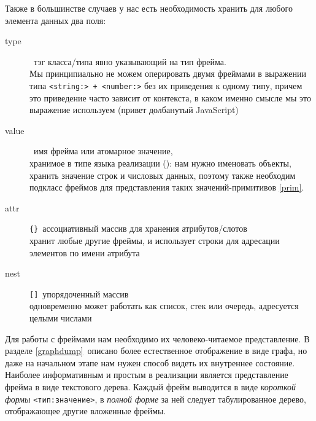 \clearpage
{}
 
Также в большинстве случаев у нас есть необходимость хранить для любого
элемента данных два поля:
\begin{description}

\item[type]\ тэг класса/типа явно указывающий на тип фрейма.\\
Мы принципиально не можем оперировать двумя фреймами в выражении типа
\verb|<string:> + <number:>| без их приведения к одному типу, причем это
приведение часто зависит от контекста, в каком именно смысле мы это выражение
используем (привет долбанутый JavaScript)

\item[value]\ имя фрейма или атомарное значение,\\хранимое в типе языка
реализации (\py): нам нужно именовать объекты, хранить значение строк и числовых
данных, поэтому также необходим подкласс фреймов для представления таких
значений-примитивов \ref{prim}.

\item[attr]\verb|{}|\ ассоциативный массив для хранения атрибутов/слотов\\
хранит любые другие фреймы, и использует строки для адресации элементов по имени
атрибута

\item[nest]\verb|[]|\ упорядоченный массив\\
одновременно может работать как список, стек или очередь, адресуется целыми
числами

\end{description}


Для работы с фреймами нам необходимо их человеко-читаемое представление. В
разделе \ref{graphdump}\ описано более естественное отображение в виде графа, но
даже на начальном этапе нам нужен способ видеть их внутреннее состояние.
Наиболее информативным и простым в реализации является представление фрейма в
виде текстового дерева. Каждый фрейм выводится в виде \emph{короткой формы}
\verb|<тип:значение>|, в \emph{полной форме} за ней следует табулированное
дерево, отображающее другие вложенные фреймы.

\smallskip
{}

